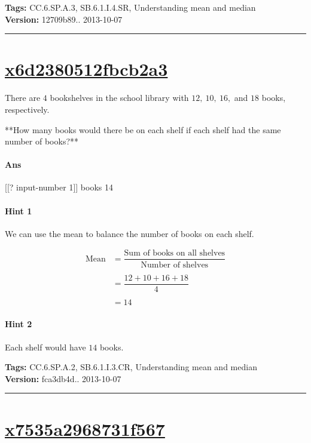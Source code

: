 \documentclass[twocolumn,10pt]{article}
\begin{document}
\medskip
\noindent
\textbf{Tags:} {\footnotesize CC.6.SP.A.3, SB.6.1.I.4.SR, Understanding mean and median}\\
\textbf{Version:} 12709b89.. 2013-10-07
\smallskip\hrule





\section{\href{https://www.khanacademy.org/devadmin/content/items/x6d2380512fbcb2a3}{x6d2380512fbcb2a3}}

\noindent
There are $4$ bookshelves in the school library with $12, ~10, ~16,$ and $18$ books, respectively. 

**How many books would there be on each shelf  if each shelf had the same number of books?**

\paragraph{Ans} [[? input-number 1]] books  14

\paragraph{Hint 1}We can use the mean to balance the number of books on each shelf.

\begin{align*}\text{Mean} &= \dfrac{\text{Sum of books on all shelves}}{\text{Number of shelves}}\\
\\
&= \dfrac{12+10+16+18 }{ 4}\\
\\&=14\end{align*}

\paragraph{Hint 2}Each shelf would have $14$ books.



\medskip
\noindent
\textbf{Tags:} {\footnotesize CC.6.SP.A.2, SB.6.1.I.3.CR, Understanding mean and median}\\
\textbf{Version:} fca3db4d.. 2013-10-07
\smallskip\hrule





\section{\href{https://www.khanacademy.org/devadmin/content/items/x7535a2968731f567}{x7535a2968731f567}}
\end{document}
